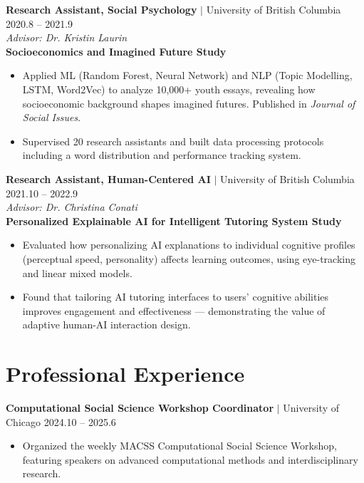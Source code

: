 \documentclass[11pt,letterpaper]{article}
\newcommand{\project}[1]{\textbf{\textcolor{black!80}{#1}}}
\newcommand{\advisor}[1]{\textit{Advisor: #1}}
\begin{document}
\vspace{0.5em}

\noindent\textbf{Research Assistant, Social Psychology} $|$ University of British Columbia \hfill 2020.8 -- 2021.9\\
\noindent\advisor{Dr. Kristin Laurin}\\[0.3em]
\noindent\project{Socioeconomics and Imagined Future Study}
\begin{itemize}
    \item Applied ML (Random Forest, Neural Network) and NLP (Topic Modelling, LSTM, Word2Vec) to analyze 10,000+ youth essays, revealing how socioeconomic background shapes imagined futures. Published in \textit{Journal of Social Issues}.
    \item Supervised 20 research assistants and built data processing protocols including a word distribution and performance tracking system.
\end{itemize}

\vspace{0.5em}

\noindent\textbf{Research Assistant, Human-Centered AI} $|$ University of British Columbia \hfill 2021.10 -- 2022.9\\
\noindent\advisor{Dr. Christina Conati}\\[0.3em]
\noindent\project{Personalized Explainable AI for Intelligent Tutoring System Study}
\begin{itemize}
    \item Evaluated how personalizing AI explanations to individual cognitive profiles (perceptual speed, personality) affects learning outcomes, using eye-tracking and linear mixed models.
    \item Found that tailoring AI tutoring interfaces to users' cognitive abilities improves engagement and effectiveness --- demonstrating the value of adaptive human-AI interaction design.
\end{itemize}

\section*{Professional Experience}

\noindent\textbf{Computational Social Science Workshop Coordinator} $|$ University of Chicago \hfill 2024.10 -- 2025.6
\begin{itemize}
    \item Organized the weekly MACSS Computational Social Science Workshop, featuring speakers on advanced computational methods and interdisciplinary research.
\end{itemize}
\end{document}
